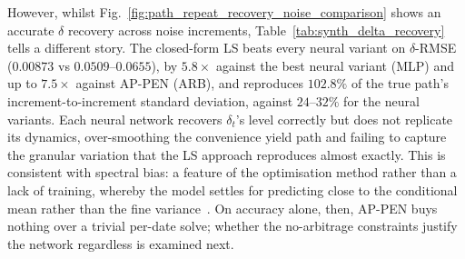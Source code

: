 \documentclass[sigconf, authorversion=true, nonacm=true]{acmart}
\begin{document}
However, whilst Fig.~\ref{fig:path_repeat_recovery_noise_comparison} shows an accurate $\delta$ recovery across noise increments, Table~\ref{tab:synth_delta_recovery} tells a different story. The closed-form LS beats every neural variant on $\delta$-RMSE ($0.00873$ vs $0.0509$--$0.0655$), by $5.8\times$ against the best neural variant (MLP) and up to $7.5\times$ against AP-PEN (ARB), and reproduces $102.8\%$ of the true path's increment-to-increment standard deviation, against $24$--$32\%$ for the neural variants. Each neural network recovers $\delta_t$'s level correctly but does not replicate its dynamics, over-smoothing the convenience yield path and failing to capture the granular variation that the LS approach reproduces almost exactly. This is consistent with spectral bias: a feature of the optimisation method rather than a lack of training, whereby the model settles for predicting close to the conditional mean rather than the fine variance~\cite{rahaman2019spectral}. On accuracy alone, then, AP-PEN buys nothing over a trivial per-date solve; whether the no-arbitrage constraints justify the network regardless is examined next.

\begin{table}[tbp]
\centering
\footnotesize
\caption{Latent-state recovery on the synthetic futures panel, run across five independent seeds. The closed-form baseline solves Eq.~\ref{eq:ls_delta} with $\psi$ profiled out, requiring no training; MLP and AP-PEN are statistically indistinguishable here. The increment ratio measures the standard deviation of the recovered day-to-day changes relative to the true changes, effectively comparing the volatility of the model's estimates against the actual data.}
\label{tab:synth_delta_recovery}
\footnotesize
{}
\end{table}
\end{document}
